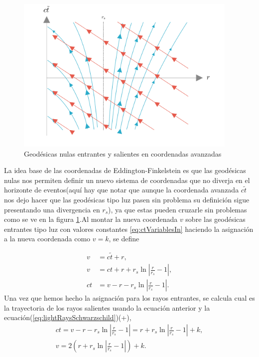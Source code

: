 \begin{figure}[H]
    \begin{small}
        \begin{center}
            \includegraphics[width=0.95\textwidth]{AgujerosNegros/Schwarzschild/media/images/EddingtonFinkelsteinIngoingLight_ManimCE_v0.19.0.png}
        \end{center}
        \caption{Geodésicas nulas entrantes y salientes en coordenadas avanzadas}
        \label{fig:EddingtonFinkelsteinInLight}
    \end{small}
\end{figure}
La idea base de las coordenadas de Eddington-Finkelstein es que las geodésicas nulas nos permiten definir un nuevo sistema de coordenadas que no diverja en el horizonte de eventos(aquí hay que notar que aunque la coordenada avanzada $c\tilde{t}$ nos dejo hacer que las geodésicas tipo luz pasen sin problema su definición sigue presentando una divergencia en $r_s$), ya que estas pueden cruzarle sin problemas como se ve en la figura \ref{fig:EddingtonFinkelsteinInLight}.Al montar la nueva coordenada \( v \) sobre las geodésicas entrantes tipo luz con valores constantes \ref{eq:ctVariablesIn} haciendo la asignación a la nueva coordenada como  $v = k$, se define

\begin{equation}
    \begin{aligned}
        v &= c\tilde{t} + r ,\\
        v  & = ct + r + r_s \ln \left| \frac{r}{r_s} - 1 \right|, \\
        ct & = v - r - r_s \ln \left| \frac{r}{r_s} - 1 \right|.
    \end{aligned}
\end{equation}
Una vez que hemos hecho la asignación para los rayos entrantes, se calcula cual es la trayectoria de los rayos salientes usando la ecuación anterior y la ecuación(\ref {eq:lightRaysSchwarzschild})(+),
\begin{equation}
    \begin{aligned}
        ct = v - r - r_s \ln \left| \frac{r}{r_s} - 1 \right|= r + r_s \ln \left| \frac{r}{r_s} - 1 \right| + k, \\
        v = 2 \left(r + r_s \ln \left| \frac{r}{r_s} - 1 \right|\right) +k.
    \end{aligned}
\end{equation}

